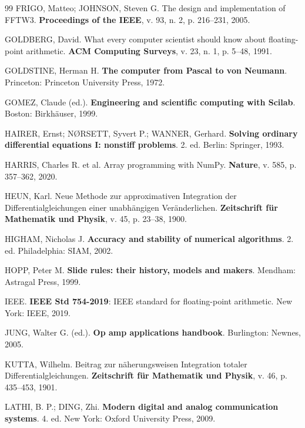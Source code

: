 \begin{thebibliography}{99}
FRIGO, Matteo; JOHNSON, Steven G. The design and implementation of FFTW3. \textbf{Proceedings of the IEEE}, v. 93, n. 2, p. 216--231, 2005.

GOLDBERG, David. What every computer scientist should know about floating-point arithmetic. \textbf{ACM Computing Surveys}, v. 23, n. 1, p. 5--48, 1991.

GOLDSTINE, Herman H. \textbf{The computer from Pascal to von Neumann}. Princeton: Princeton University Press, 1972.

GOMEZ, Claude (ed.). \textbf{Engineering and scientific computing with Scilab}. Boston: Birkhäuser, 1999.

HAIRER, Ernst; NØRSETT, Syvert P.; WANNER, Gerhard. \textbf{Solving ordinary differential equations I: nonstiff problems}. 2. ed. Berlin: Springer, 1993.

HARRIS, Charles R. et al. Array programming with NumPy. \textbf{Nature}, v. 585, p. 357--362, 2020.

HEUN, Karl. Neue Methode zur approximativen Integration der Differentialgleichungen einer unabhängigen Veränderlichen. \textbf{Zeitschrift für Mathematik und Physik}, v. 45, p. 23--38, 1900.

HIGHAM, Nicholas J. \textbf{Accuracy and stability of numerical algorithms}. 2. ed. Philadelphia: SIAM, 2002.

HOPP, Peter M. \textbf{Slide rules: their history, models and makers}. Mendham: Astragal Press, 1999.

IEEE. \textbf{IEEE Std 754-2019}: IEEE standard for floating-point arithmetic. New York: IEEE, 2019.

JUNG, Walter G. (ed.). \textbf{Op amp applications handbook}. Burlington: Newnes, 2005.

KUTTA, Wilhelm. Beitrag zur näherungsweisen Integration totaler Differentialgleichungen. \textbf{Zeitschrift für Mathematik und Physik}, v. 46, p. 435--453, 1901.

LATHI, B. P.; DING, Zhi. \textbf{Modern digital and analog communication systems}. 4. ed. New York: Oxford University Press, 2009.


\end{thebibliography}
